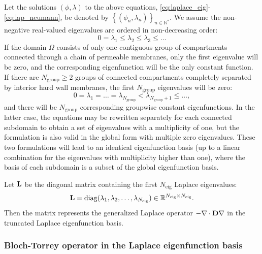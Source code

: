 \documentclass[a4paper]{article}
\begin{document}
Let the solutions $(\phi, \lambda)$ to the above equations, \eqref{eq:laplace_eig}-\eqref{eq:lap_neumann}, be denoted by $\left\{(\phi_n, \lambda_n)\right\}_{n \in \mathbb{N}^*}$. We assume the non-negative real-valued eigenvalues are ordered in non-decreasing order:
\begin{equation*}
    0 = \lambda_1 \leq \lambda_2 \leq \lambda_3 \leq \dots
\end{equation*}
If the domain $\Omega$ consists of only one contiguous group of compartments connected through a chain of permeable membranes, only the first eigenvalue will be zero, and the corresponding eigenfunction will be the only constant function. If there are $N_\text{group} \geq 2$ groups of connected compartments completely separated by interior hard wall membranes, the first $N_\text{group}$ eigenvalues will be zero:
\begin{equation*}
    0 = \lambda_1 = \dots = \lambda_{N_\text{group}} < \lambda_{N_\text{group} + 1} \leq \dots,
\end{equation*}
and there will be $N_\text{group}$ corresponding groupwise constant eigenfunctions. In the latter case, the equations may be rewritten separately for each connected subdomain to obtain a set of eigenvalues with a multiplicity of one, but the formulation is also valid in the global form with multiple zero eigenvalues. These two formulations will lead to an identical eigenfunction basis (up to a linear combination for the eigenvalues with multiplicity higher than one), where the basis of each subdomain is a subset of the global eigenfunction basis.

Let $\mathbf{L}$ be the diagonal matrix containing the first $N_\text{eig}$ Laplace eigenvalues:
\begin{equation}
    \mathbf{L} = \operatorname{diag}(\lambda_1, \lambda_2, \dots, \lambda_{N_\text{eig}})\in \mathbb{R}^{N_\text{eig} \times N_\text{eig}}.
\end{equation}
Then the matrix  represents the generalized Laplace operator $-\nabla \cdot \mathbf{D} \nabla$ in the truncated Laplace eigenfunction basis.


\subsubsection{Bloch-Torrey operator in the Laplace eigenfunction basis}
\end{document}
